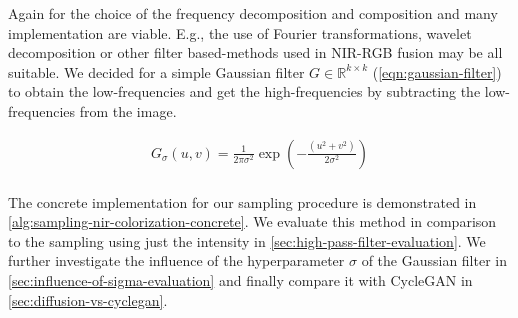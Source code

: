 Again for the choice of the frequency decomposition and composition  and 
many implementation are viable.
E.g., the use of Fourier transformations, wavelet decomposition or other filter based-methods used in NIR-RGB fusion \parencite{study-vis-nir-fusion} may be all suitable.
We decided for a simple Gaussian filter $G \in \mathbb{R}^{k \times k}$ (\autoref{eqn:gaussian-filter}) to obtain the low-frequencies \parencite{computer-vision-a-modern-approach} and get the high-frequencies by subtracting the low-frequencies from the image.

\begin{equation}
   \label{eqn:gaussian-filter}
   \begin{aligned}
      G_{\sigma}(u,v) = \frac{1}{2 \pi \sigma^2} \exp\left(-\frac{(u^2+ v^2)}{2\sigma^2}\right) \\
   \end{aligned}
\end{equation}

The concrete implementation for our sampling procedure is demonstrated in \autoref{alg:sampling-nir-colorization-concrete}.
We evaluate this method in comparison to the sampling using just the intensity in \autoref{sec:high-pass-filter-evaluation}.
We further investigate the influence of the hyperparameter $\sigma$ of the Gaussian filter in \autoref{sec:influence-of-sigma-evaluation}
and finally compare it with CycleGAN in \autoref{sec:diffusion-vs-cyclegan}.

